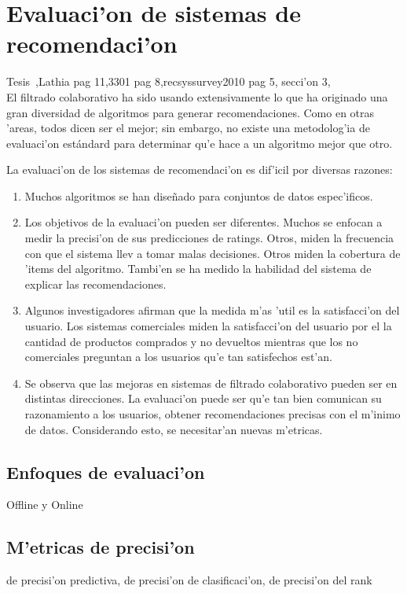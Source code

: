 \documentclass[11pt]{article}
\begin{document}
\section{Evaluaci'on de sistemas de recomendaci'on}

Tesis~\cite{eemcs13083},Lathia pag 11,3301 pag 8,recsyssurvey2010 pag 5, secci'on 3,\cite{Herlocker04evaluatingcollaborative}\\

El filtrado colaborativo ha sido usando extensivamente lo que ha originado una gran diversidad de algoritmos para generar recomendaciones. Como en otras 'areas, todos dicen ser el mejor; sin embargo, no existe una metodolog'ia de evaluaci'on estándard para determinar qu'e hace a un algoritmo mejor que otro.

La evaluaci'on de los sistemas de recomendaci'on es dif'icil por diversas razones:
\begin{enumerate}
\item Muchos algoritmos se han dise\~{n}ado para conjuntos de datos espec'ificos.
\item Los objetivos de la evaluaci'on pueden ser diferentes. Muchos se enfocan a medir la precisi'on de sus predicciones de ratings. Otros, miden la frecuencia con que el sistema llev a tomar malas decisiones. Otros miden la cobertura de 'items del algoritmo. Tambi'en se ha medido la habilidad del sistema de explicar las recomendaciones.
\item Algunos investigadores afirman que la medida m'as 'util es la satisfacci'on del usuario. Los sistemas comerciales miden la satisfacci'on del usuario por el la cantidad de productos comprados y no devueltos mientras que los no comerciales preguntan a los usuarios qu'e tan satisfechos est'an.
\item Se observa que las mejoras en sistemas de filtrado colaborativo pueden ser en distintas direcciones. La evaluaci'on puede ser qu'e tan bien comunican su razonamiento a los usuarios, obtener recomendaciones precisas con el m'inimo de datos. Considerando esto, se necesitar'an nuevas m'etricas.
\end{enumerate}



\subsection{Enfoques de evaluaci'on}
Offline y Online
\subsection{M'etricas de precisi'on}
de precisi'on predictiva, de precisi'on de clasificaci'on, de precisi'on del rank
\end{document}
